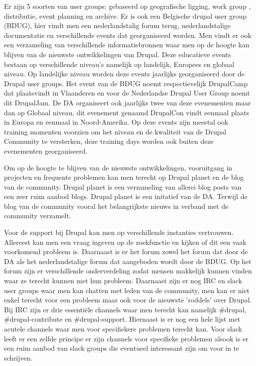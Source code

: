 Er zijn 5 soorten van user groups: gebaseerd op geografische ligging, work group , distributie, event planning en archive. Er is ook een Belgische drupal user group (BDUG), hier vindt men een nederlandstalig forum terug, nederlandstalige documentatie en verschillende events dat georganiseerd worden. Men vindt er ook een verzameling van verschillende informatiebronnen waar men op de hoogte kan blijven van de nieuwste ontwikkelingen van Drupal. Deze educatieve events bestaan op verschillende niveau's namelijk op landelijk, Europees en globaal niveau. Op landelijke niveau worden deze events jaarlijks georganiseerd door de Drupal user groups. Het event van de BDUG noemt respectievelijk DrupalCamp dat plaatsvindt in Vlaanderen en voor de Nederlandse Drupal User Group noemt dit DrupalJam. De DA organiseert ook jaarlijks twee van deze evenementen maar dan op Globaal niveau, dit evenement genaamd DrupalCon vindt eenmaal plaats in Europa en eenmaal in Noord-Amerika. Op deze events zijn meestal ook training momenten voorzien om het niveau en de kwaliteit van de Drupal Community te versterken, deze training days worden ook buiten deze evenementen georganiseerd.

Om op de hoogte te blijven van de nieuwste ontwikkelingen, vooruitgang in projecten en frequente problemen kan men terecht op Drupal planet en de blog van de community. Drupal planet is een verzameling van allerei blog posts van een zeer ruim aanbod blogs. Drupal planet is een initatief van de DA. Terwijl de blog van de community vooral het belangrijkste nieuws in verband met de community verzamelt.

Voor de support bij Drupal kan men op verschillende instanties vertrouwen. Allereest kan men een vraag ingeven op de zoekfunctie en kijken of dit een vaak voorkomend probleem is. Daarnaast is er het forum zowel het forum dat door de DA als het nederlandstalige forum dat aangeboden wordt door de BDUG. Op het forum zijn er verschillende onderverdeling zodat mensen makkelijk kunnen vinden waar ze terecht kunnen met hun probleem. Daarnaast zijn er nog IRC en slack user groups waar men kan chatten met leden van de community, men kan er niet enkel terecht voor een probleem maar ook voor de nieuwste 'roddels' over Drupal. Bij IRC zijn er drie essentiële channels waar men terecht kan namelijk \#drupal, \#drupal-contribute en \#drupal-support. Hiernaast is er nog een hele lijst met acutele channels waar men voor specifiekere problemen terecht kan. Voor slack leeft er een zelfde principe er zijn channels voor specifieke problemen alsook is er een ruim aanbod van slack groups die eventueel interessant zijn om voor in te schrijven.

